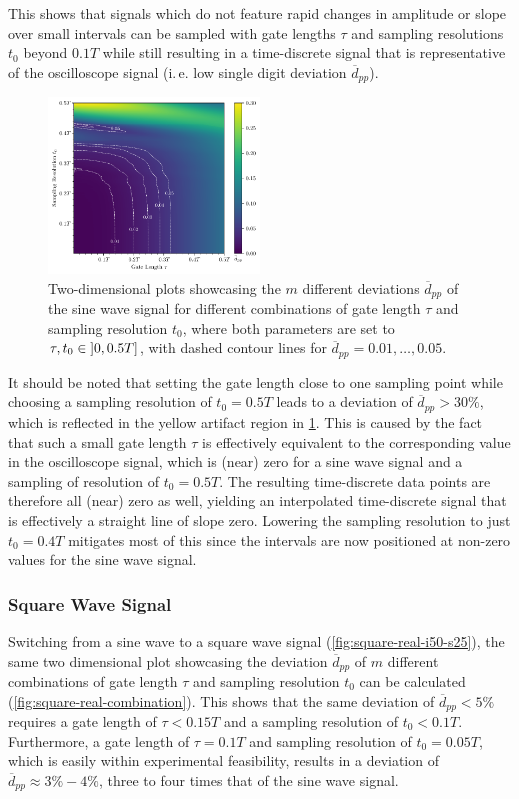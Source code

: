 This shows that signals which do not feature rapid changes in amplitude or slope over small intervals can be sampled with gate lengths $\tau$ and sampling resolutions $t_0$ beyond $0.1T$ while still resulting in a time-discrete signal that is representative of the oscilloscope signal (i.\,e. low single digit deviation $\overline{d}_{pp}$).
\begin{figure}[H]
	\centering
	\includegraphics[width=0.5\textwidth]{Figures/Combinations/sine_real.pdf}
	\caption{Two-dimensional plots showcasing the $m$ different deviations $\overline{d}_{pp}$ of the sine wave signal for different combinations of gate length $\tau$ and sampling resolution $t_0$, where both parameters are set to $\tau, t_0 \in \interval[scaled, open left]{0}{0.5T}$, with dashed contour lines for $\overline{d}_{pp} = 0.01, \dotsc ,0.05$.}
	\label{fig:sine-real-combination}
\end{figure}
It should be noted that setting the gate length close to one sampling point while choosing a sampling resolution of $t_0 = 0.5T$ leads to a deviation of $\overline{d}_{pp} > 30\%$, which is reflected in the yellow artifact region in \cref{fig:sine-real-combination}. This is caused by the fact that such a small gate length $\tau$ is effectively equivalent to the corresponding value in the oscilloscope signal, which is (near) zero for a sine wave signal and a sampling of resolution of $t_0 = 0.5T$. The resulting time-discrete data points are therefore all (near) zero as well, yielding an interpolated time-discrete signal that is effectively a straight line of slope zero. Lowering the sampling resolution to just $t_0 = 0.4T$ mitigates most of this since the intervals are now positioned at non-zero values for the sine wave signal.
\subsubsection{Square Wave Signal} \label{sssec:square-wave}
Switching from a sine wave to a square wave signal (\cref{fig:square-real-i50-s25}), the same two dimensional plot showcasing the deviation $\overline{d}_{pp}$ of $m$ different combinations of gate length $\tau$ and sampling resolution $t_0$ can be calculated (\cref{fig:square-real-combination}). This shows that the same deviation of $\overline{d}_{pp} < 5\%$ requires a gate length of $\tau < 0.15T$ and a sampling resolution of $t_0 < 0.1T$. Furthermore, a gate length of $\tau = 0.1T$ and sampling resolution of $t_0 = 0.05T$, which is easily within experimental feasibility, results in a deviation of $\overline{d}_{pp} \approx 3\% - 4\%$, three to four times that of the sine wave signal.

